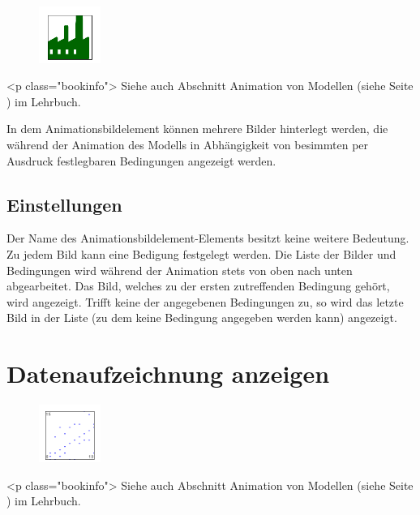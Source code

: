 \begin{figure}
\vspace{-22pt}
\includegraphics[width=2cm]{imageModelElementAnimationImage.png}
\vspace{-22pt}
\end{figure}

<p class="bookinfo">
Siehe auch Abschnitt Animation von Modellen (siehe Seite \pageref{ref:book:5.4.3}) im Lehrbuch.

In dem Animationsbildelement können mehrere Bilder hinterlegt werden, die während der
Animation des Modells in Abhängigkeit von besimmten per Ausdruck festlegbaren
Bedingungen angezeigt werden.

\subsection*{Einstellungen}

Der Name des Animationsbildelement-Elements besitzt keine weitere Bedeutung. 
Zu jedem Bild kann eine Bedigung festgelegt werden. Die Liste der Bilder und
Bedingungen wird während der Animation stets von oben nach unten abgearbeitet.
Das Bild, welches zu der ersten zutreffenden Bedingung gehört, wird angezeigt.
Trifft keine der angegebenen Bedingungen zu, so wird das letzte Bild in der
Liste (zu dem keine Bedingung angegeben werden kann) angezeigt.


\section{Datenaufzeichnung anzeigen}
\label{ref:ModelElementAnimationRecord}

\begin{figure}
\vspace{-22pt}
\includegraphics[width=2cm]{imageModelElementAnimationRecord.png}
\vspace{-22pt}
\end{figure}

<p class="bookinfo">
Siehe auch Abschnitt Animation von Modellen (siehe Seite \pageref{ref:book:5.4.3}) im Lehrbuch.


